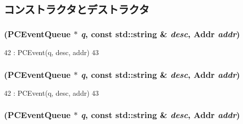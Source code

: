 \subsection{コンストラクタとデストラクタ}
\hypertarget{classIdleStartEvent_a6c28e9bbae2fd0051649013c91a6eaa3}{
\subsubsection[{IdleStartEvent}]{ ({\bf PCEventQueue} $\ast$ {\em q}, \/  const std::string \& {\em desc}, \/  {\bf Addr} {\em addr})}}
\label{classIdleStartEvent_a6c28e9bbae2fd0051649013c91a6eaa3}



\begin{DoxyCode}
42         : PCEvent(q, desc, addr)
43     {}
\end{DoxyCode}
\hypertarget{classIdleStartEvent_a6c28e9bbae2fd0051649013c91a6eaa3}{
\subsubsection[{IdleStartEvent}]{ ({\bf PCEventQueue} $\ast$ {\em q}, \/  const std::string \& {\em desc}, \/  {\bf Addr} {\em addr})}}
\label{classIdleStartEvent_a6c28e9bbae2fd0051649013c91a6eaa3}



\begin{DoxyCode}
42         : PCEvent(q, desc, addr)
43     {}
\end{DoxyCode}
\hypertarget{classIdleStartEvent_a6c28e9bbae2fd0051649013c91a6eaa3}{
\subsubsection[{IdleStartEvent}]{ ({\bf PCEventQueue} $\ast$ {\em q}, \/  const std::string \& {\em desc}, \/  {\bf Addr} {\em addr})}}
\label{classIdleStartEvent_a6c28e9bbae2fd0051649013c91a6eaa3}



